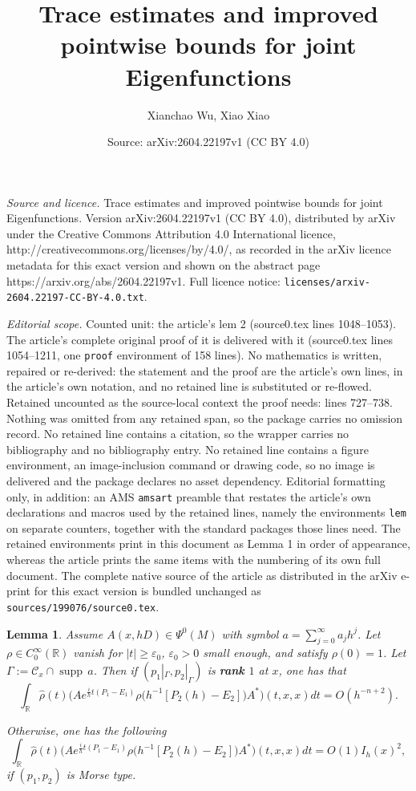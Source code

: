 \documentclass[10pt,a4paper]{amsart}
\title{Trace estimates and improved pointwise bounds for joint Eigenfunctions}
\author{Xianchao Wu, Xiao Xiao}
\date{Source: arXiv:2604.22197v1 (CC BY 4.0)}
\newtheorem{lem}{Lemma}
\renewcommand{\epsilon}{\varepsilon}
\newcommand{\supp}{{\operatorname{supp\,}}}
\begin{document}
\maketitle

\noindent\emph{Source and licence.} Trace estimates and improved pointwise bounds for joint Eigenfunctions. Version arXiv:2604.22197v1 (CC BY 4.0), distributed by arXiv under the Creative Commons Attribution 4.0 International licence, http://creativecommons.org/licenses/by/4.0/, as recorded in the arXiv licence metadata for this exact version and shown on the abstract page https://arxiv.org/abs/2604.22197v1. Full licence notice: \texttt{licenses/arxiv-2604.22197-CC-BY-4.0.txt}.\par\smallskip

\noindent\textit{Editorial scope.} Counted unit: the article's lem 2 (source0.tex lines 1048--1053). The article's complete original proof of it is delivered with it (source0.tex lines 1054--1211, one \texttt{proof} environment of 158 lines). No mathematics is written, repaired or re-derived: the statement and the proof are the article's own lines, in the article's own notation, and no retained line is substituted or re-flowed.  Retained uncounted as the source-local context the proof needs: lines 727--738.  Nothing was omitted from any retained span, so the package carries no omission record.  No retained line contains a citation, so the wrapper carries no bibliography and no bibliography entry.  No retained line contains a figure environment, an image-inclusion command or drawing code, so no image is delivered and the package declares no asset dependency.  Editorial formatting only, in addition: an AMS \texttt{amsart} preamble that restates the article's own declarations and macros used by the retained lines, namely the environments \texttt{lem} on separate counters, together with the standard packages those lines need.  The retained environments print in this document as Lemma 1 in order of appearance, whereas the article prints the same items with the numbering of its own full document.  The complete native source of the article as distributed in the arXiv e-print for this exact version is bundled unchanged as \texttt{sources/199076/source0.tex}.
\begin{lem}\label{lwl}
Assume $A(x, hD)\in \Psi^0(M)$ with symbol $a=\sum_{j=0}^\infty a_j h^j$. Let $\rho\in C_0^\infty(\mathbb{R})$ vanish for $|t|\geq \epsilon_0$, $\epsilon_0>0$ small enough, and satisfy $\rho(0)=1$. Let $\Gamma:=\mathcal{C}_x\cap \supp a$. Then if $(p_1|_{\Gamma}, p_2|_{\Gamma})$ is {\bf rank $1$} at $x$, one has that
\begin{equation}\label{main lemma eq2}
\int_{\mathbb{R}} \hat{\rho}(t) \big(A e^{\frac{i}h t(P_1-E_1)}  \rho\big(h^{-1}[P_2(h)-E_2]\big)  A^*\big)(t,x,x) dt =O(h^{-n+2}).
\end{equation}

Otherwise, one has the following
\begin{equation}\label{main lemma eq}
\int_{\mathbb{R}} \hat{\rho}(t) \big(A e^{\frac{i}h t(P_1-E_1)}  \rho\big(h^{-1}[P_2(h)-E_2]\big)  A^*\big)(t,x,x) dt=O(1) I_h(x)^2,
\end{equation}
if $(p_1, p_2)$ is Morse type.
\end{lem}
\end{document}
